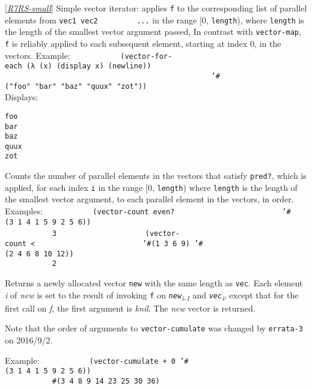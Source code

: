 \begin{entry}{%
  }

  {[}\protect\hyperlink{R7RS-small}{\emph{R7RS-small}}{]} Simple
  vector iterator: applies \texttt{f} to the corresponding list of
  parallel elements from \texttt{vec1~vec2~~~~~~~~~...} in the range
  {[}0, \texttt{length}), where \texttt{length} is the length of the
  smallest vector argument passed, In contrast with
  \texttt{vector-map}, \texttt{f} is reliably applied to each
  subsequent element, starting at index 0, in the vectors.  Example:
  \texttt{~~~~~~~~~~~(vector-for-each~(λ~(x)~(display~x)~(newline))~~~~~~~~~}\\
  \texttt{~~~~~~~~~~~~~~~~~~~~~~~~~~~~~~~~~~~~~~~~~~~~~~~~'\#("foo"~"bar"~"baz"~"quux"~"zot"))~~~~~~~~~}\\
  Displays:\\

\begin{verbatim}
foo
bar
baz
quux
zot
\end{verbatim}
\end{entry}

\begin{entry}{%
  }

  Counts the number of parallel
  elements in the vectors that satisfy \texttt{pred?}, which is
  applied, for each index \texttt{i} in the range {[}0,
  \texttt{length}) where \texttt{length} is the length of the smallest
  vector argument, to each parallel element in the vectors, in order.
  Examples:
  \texttt{~~~~~~~~~~~(vector-count~even?~~~~~~~~~~~~~~~~~~~~~~~~~'\#(3~1~4~1~5~9~2~5~6))~~~~~~~~~}\\
  \texttt{~~~~~~~~~~~3~~~~~~~~~}
  \texttt{~~~~~~~~~~~(vector-count~\textless{}~~~~~~~~~~~~~~~~~~~~~~~~~'\#(1~3~6~9)~'\#(2~4~6~8~10~12))~~~~~~~~~}\\
  \texttt{~~~~~~~~~~~2~~~~~~~~~}
\end{entry}

\begin{entry}{%
  }

  Returns a newly allocated vector \texttt{new} with the same length
  as \texttt{vec}. Each element \emph{i} of \emph{new} is set to the
  result of invoking \texttt{f} on
  \emph{\texttt{new}\textsubscript{i-1}} and
  \emph{\texttt{vec}\textsubscript{i}}, except that for the first call
  on \emph{f}, the first argument is \emph{knil}. The \emph{new}
  vector is returned.

  Note that the order of arguments to \texttt{vector-cumulate} was
  changed by \texttt{errata-3} on 2016/9/2.

  Example:
  \texttt{~~~~~~~~~~~(vector-cumulate~+~0~'\#(3~1~4~1~5~9~2~5~6))~~~~~~~~~}\\
  \texttt{~~~~~~~~~~~\#(3~4~8~9~14~23~25~30~36)~~~~~~~~~}\\[4\baselineskip]
\end{entry}

